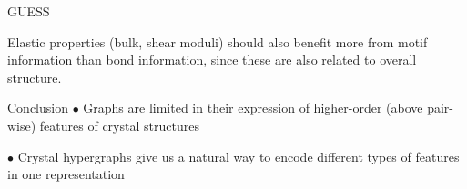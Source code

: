 \documentclass[11pt]{beamer}
\begin{document}
\begin{frame}{GUESS}

Elastic properties (bulk, shear moduli) should also benefit more from motif information than bond information, since these are also related to overall structure.
\end{frame}

\begin{frame}{Conclusion}
$\bullet$ Graphs are limited in their expression of higher-order (above pair-wise) features of crystal structures

\vspace{.5cm}\pause

$\bullet$ Crystal hypergraphs give us a natural way to encode different types of features in one representation
\end{frame}
\end{document}
